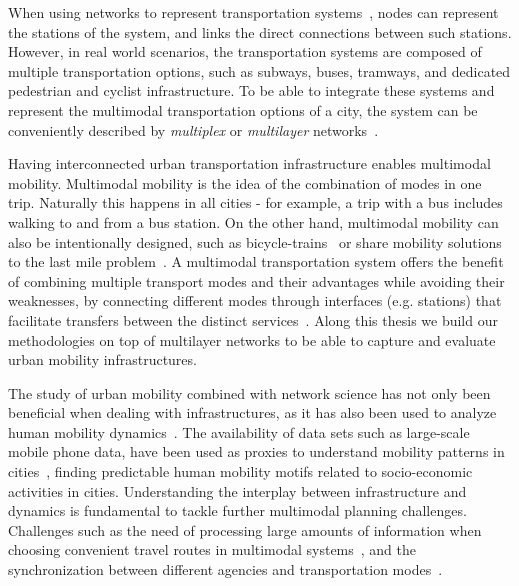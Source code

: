 When using networks to represent transportation systems~\cite{lin2013complex}, nodes can represent the stations of the system, and links the direct connections between such stations. However, in real world scenarios, the transportation systems are composed of multiple transportation options, such as subways, buses, tramways, and dedicated pedestrian and cyclist infrastructure. To be able to integrate these systems and represent the multimodal transportation options of a city, the system can be conveniently described by \textit{multiplex} or \textit{multilayer} networks~\cite{dedomenico2013mathematical,kivela2014multilayer,boccaletti2014structure,battiston2014structural}. 

Having interconnected urban transportation infrastructure enables multimodal mobility. Multimodal mobility is the idea of the combination of modes in one trip. Naturally this happens in all cities - for example, a trip with a bus includes walking to and from a bus station. On the other hand, multimodal mobility can also be intentionally designed, such as bicycle-trains~\cite{geurs2016multi} or share mobility solutions to the last mile problem~\cite{shaheen2016mobility}. A multimodal transportation system offers the benefit of combining multiple transport modes and their advantages while avoiding their weaknesses, by connecting different modes through interfaces (e.g. stations) that facilitate transfers between the distinct services~\cite{vannes2002design}. Along this thesis we build our methodologies on top of multilayer networks to be able to capture and evaluate urban mobility infrastructures.

The study of urban mobility combined with network science has not only been beneficial when dealing with infrastructures, as it has also been used to analyze human mobility dynamics~\cite{barbosa2018human}. The availability of data sets such as large-scale mobile phone data, have been used as proxies to understand mobility patterns in cities~\cite{gonzalez2008understanding}, finding predictable human mobility motifs related to socio-economic activities in cities. Understanding the interplay between infrastructure and dynamics is fundamental to tackle further multimodal planning challenges. Challenges such as the need of processing large amounts of information when choosing convenient travel routes in multimodal systems~\cite{gallotti2016limits}, and the synchronization between different agencies and transportation modes~\cite{barthelemy2016structure}.

